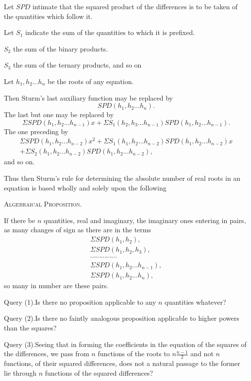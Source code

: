 \documentclass[11pt]{article}
\newcommand{\sourcepage}[1]{\marginpar{\scriptsize p.~#1}}
\newcommand{\SPD}{\mathit{SPD}}
\begin{document}
Let $\SPD$ intimate that the squared product of the differences is to be taken of the quantities which follow it.

Let $S_1$ indicate the sum of the quantities to which it is prefixed.

\hspace{2em}$S_2$ the sum of the binary products.

\hspace{2em}$S_3$ the sum of the ternary products, and so on

Let $h_1,h_2\ldots h_n$ be the roots of any equation.

Then Sturm's last auxiliary function may be replaced by
\[
 \SPD(h_1,h_2\ldots h_n).
\]
The last but one may be replaced by
\[
 \Sigma\SPD(h_1,h_2\ldots h_{n-1})x+
 \Sigma S_1(h_2,h_3\ldots h_{n-1})\SPD(h_1,h_2\ldots h_{n-1}).
\]
The one preceding by
\begin{multline*}
 \Sigma\SPD(h_1,h_2\ldots h_{n-2})x^2
 +\Sigma S_1(h_1,h_2\ldots h_{n-2})\SPD(h_1,h_2\ldots h_{n-2})x\\
 +\Sigma S_2(h_1,h_2\ldots h_{n-2})\SPD(h_1,h_2\ldots h_{n-2}),
\end{multline*}
and so on.

Thus then Sturm's rule for determining the absolute number of real roots in an equation is based wholly and solely upon the following

\begin{center}\scshape Algebraical Proposition.\end{center}

If there be $n$ quantities, real and imaginary, the imaginary ones entering in pairs, as many changes of sign as there are in the terms
\[
\begin{gathered}
\Sigma\SPD(h_1,h_2),\\
\Sigma\SPD(h_1,h_2,h_3),\\
\cdots\cdots\cdots\cdots\cdots\\
\Sigma\SPD(h_1,h_2\ldots h_{n-1}),\\
\Sigma\SPD(h_1,h_2\ldots h_n),
\end{gathered}
\]
so many in number are these pairs.

\sourcepage{46}
\noindent Query (1).\quad Is there no proposition applicable to any $n$ quantities whatever?

Query (2).\quad Is there no faintly analogous proposition applicable to higher powers than the squares?

Query (3).\quad Seeing that in forming the coefficients in the equation of the squares of the differences, we pass from $n$ functions of the roots to $n\frac{n-1}{2}$ and not $n$ functions, of their squared differences, does not a natural passage to the former lie through $n$ functions of the squared differences?
\end{document}

